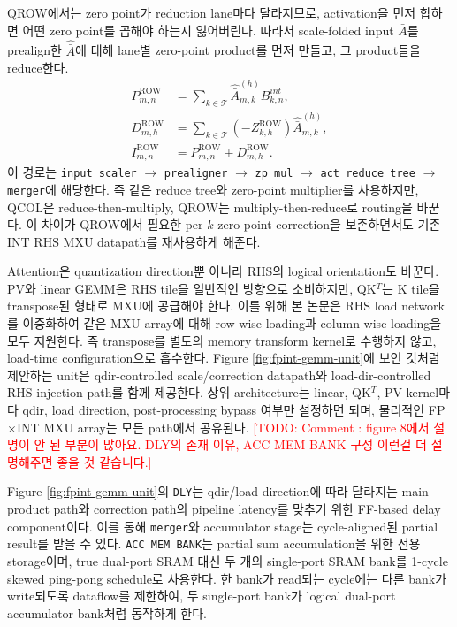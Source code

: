 \documentclass[11pt]{article}
\newcommand{\todo}[1]{\textcolor{red}{[TODO: #1]}}
\newcommand{\fpint}{FP$\times$INT}
\begin{document}
QROW에서는 zero point가 reduction lane마다 달라지므로, activation을 먼저 합하면 어떤 zero point를 곱해야 하는지 잃어버린다.
따라서 scale-folded input $\bar{A}$를 prealign한 $\hat{\bar{A}}$에 대해 lane별 zero-point product를 먼저 만들고, 그 product들을 reduce한다.
\begin{align}
    P^{\mathrm{ROW}}_{m,n} &= \sum_{k \in \mathcal{T}} \hat{\bar{A}}^{(h)}_{m,k} B^{int}_{k,n}, \\
    D^{\mathrm{ROW}}_{m,h} &= \sum_{k \in \mathcal{T}} (-Z^{\mathrm{ROW}}_{k,h}) \hat{\bar{A}}^{(h)}_{m,k}, \\
    I^{\mathrm{ROW}}_{m,n} &= P^{\mathrm{ROW}}_{m,n} + D^{\mathrm{ROW}}_{m,h} .
    \label{eq:qrow-correction}
\end{align}
이 경로는 \texttt{input scaler} $\rightarrow$ \texttt{prealigner} $\rightarrow$ \texttt{zp mul} $\rightarrow$ \texttt{act reduce tree} $\rightarrow$ \texttt{merger}에 해당한다.
즉 같은 reduce tree와 zero-point multiplier를 사용하지만, QCOL은 reduce-then-multiply, QROW는 multiply-then-reduce로 routing을 바꾼다.
이 차이가 QROW에서 필요한 per-$k$ zero-point correction을 보존하면서도 기존 INT RHS MXU datapath를 재사용하게 해준다.

Attention은 quantization direction뿐 아니라 RHS의 logical orientation도 바꾼다.
PV와 linear GEMM은 RHS tile을 일반적인 방향으로 소비하지만, QK$^T$는 K tile을 transpose된 형태로 MXU에 공급해야 한다.
이를 위해 본 논문은 RHS load network를 이중화하여 같은 MXU array에 대해 row-wise loading과 column-wise loading을 모두 지원한다.
즉 transpose를 별도의 memory transform kernel로 수행하지 않고, load-time configuration으로 흡수한다.
Figure \ref{fig:fpint-gemm-unit}에 보인 것처럼 제안하는 unit은 qdir-controlled scale/correction datapath와 load-dir-controlled RHS injection path를 함께 제공한다.
상위 architecture는 linear, QK$^T$, PV kernel마다 qdir, load direction, post-processing bypass 여부만 설정하면 되며, 물리적인 \fpint{} MXU array는 모든 path에서 공유된다. \todo{Comment : figure 8에서 설명이 안 된 부분이 많아요. DLY의 존재 이유, ACC MEM BANK 구성 이런걸 더 설명해주면 좋을 것 같습니다.}

Figure \ref{fig:fpint-gemm-unit}의 \texttt{DLY}는 qdir/load-direction에 따라 달라지는 main product path와 correction path의 pipeline latency를 맞추기 위한 FF-based delay component이다.
이를 통해 \texttt{merger}와 accumulator stage는 cycle-aligned된 partial result를 받을 수 있다.
\texttt{ACC MEM BANK}는 partial sum accumulation을 위한 전용 storage이며, true dual-port SRAM 대신 두 개의 single-port SRAM bank를 1-cycle skewed ping-pong schedule로 사용한다.
한 bank가 read되는 cycle에는 다른 bank가 write되도록 dataflow를 제한하여, 두 single-port bank가 logical dual-port accumulator bank처럼 동작하게 한다.
\end{document}
